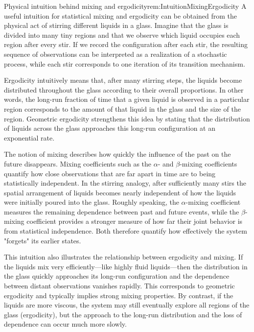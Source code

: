 \documentclass[12pt,a4paper]{article}
\theoremstyle{definition}
\begin{document}
\begin{remark}{Physical intuition behind mixing and ergodicity}{rem:IntuitionMixingErgodicity}
    A useful intuition for statistical mixing and ergodicity can be obtained from the physical act of stirring different liquids in a glass. Imagine that the glass is divided into many tiny regions and that we observe which liquid occupies each region after every stir. If we record the configuration after each stir, the resulting sequence of observations can be interpreted as a realization of a stochastic process, while each stir corresponds to one iteration of its transition mechanism.

    Ergodicity intuitively means that, after many stirring steps, the liquids become distributed throughout the glass according to their overall proportions. In other words, the long-run fraction of time that a given liquid is observed in a particular region corresponds to the amount of that liquid in the glass and the size of the region. Geometric ergodicity strengthens this idea by stating that the distribution of liquids across the glass approaches this long-run configuration at an exponential rate.

    The notion of mixing describes how quickly the influence of the past on the future disappears. Mixing coefficients such as the $\alpha$- and $\beta$-mixing coefficients quantify how close observations that are far apart in time are to being statistically independent. In the stirring analogy, after sufficiently many stirs the spatial arrangement of liquids becomes nearly independent of how the liquids were initially poured into the glass. Roughly speaking, the $\alpha$-mixing coefficient measures the remaining dependence between past and future events, while the $\beta$-mixing coefficient provides a stronger measure of how far their joint behavior is from statistical independence. Both therefore quantify how effectively the system "forgets" its earlier states.

    This intuition also illustrates the relationship between ergodicity and mixing. If the liquids mix very efficiently—like highly fluid liquids—then the distribution in the glass quickly approaches its long-run configuration and the dependence between distant observations vanishes rapidly. This corresponds to geometric ergodicity and typically implies strong mixing properties. By contrast, if the liquids are more viscous, the system may still eventually explore all regions of the glass (ergodicity), but the approach to the long-run distribution and the loss of dependence can occur much more slowly.
\end{remark}
\end{document}
